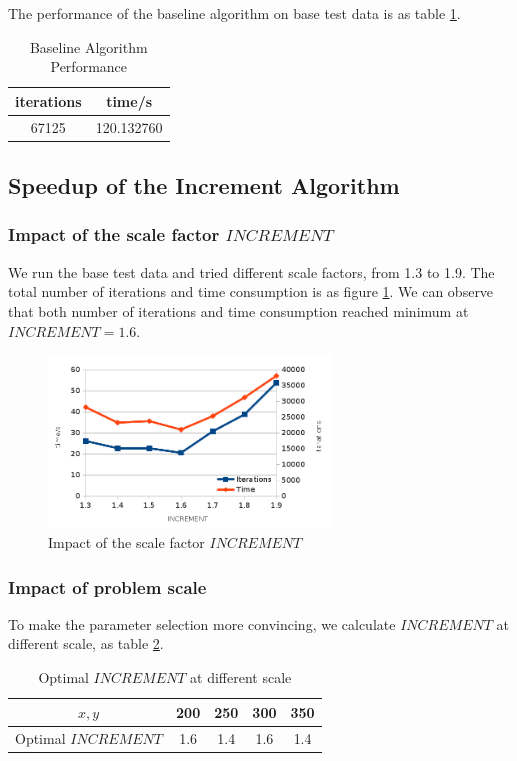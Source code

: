 \documentclass{acm_proc_article-sp}
\begin{document}
The performance of the baseline algorithm on base test data is as table \ref{baseline}.

\begin{table}[htbp]
  \centering\caption{\label{baseline}Baseline Algorithm Performance}
  \begin{tabular}{|c|c|}
  \hline
  iterations & time/s \\
  \hline
  67125 & 120.132760\\
  \hline
  \end{tabular}
\end{table}

\subsection{Speedup of the Increment Algorithm}
\subsubsection{Impact of the scale factor $INCREMENT$}
We run the base test data and tried different scale factors, from 1.3 to 1.9. The total number of iterations and time consumption is as figure \ref{impactscalefactor}. We can observe that both number of iterations and time consumption reached minimum at $INCREMENT=1.6$.

\begin{figure}[htbp]
\centering 
\includegraphics[width=7.5cm]{impactscalefactor.png}
\caption{Impact of the scale factor $INCREMENT$}
\label{impactscalefactor} 
\end{figure}

\subsubsection{Impact of problem scale}

To make the parameter selection more convincing, we calculate $INCREMENT$ at different scale, as table \ref{TIncrementScale}. 

\begin{table}[htbp]
  \centering\caption{\label{TIncrementScale}Optimal $INCREMENT$ at different scale}
  \begin{tabular}{|c|c|c|c|c|}
  \hline
  $x, y$ & 200 & 250 & 300 & 350\\
  \hline
  Optimal $INCREMENT$ & 1.6 & 1.4 & 1.6 & 1.4\\
  \hline
  \end{tabular}
\end{table}
\end{document}
